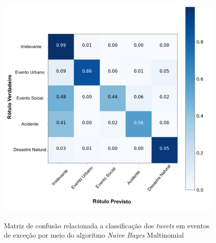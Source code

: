 \documentclass[
	12pt,				%
	oneside,			%
	a4paper,			%
	english,			%
	brazil				%
	]{abntex2ppgsi}
\begin{document}
{{{\begin{apendicesenv}
\begin{figure}[!htb]
	\centering
 	  \caption{Matriz de confusão relacionada a classificação dos \textit{tweets} em eventos de exceção por meio do algoritmo \textit{Naive Bayes} Multinomial}
		\includegraphics[width=1\linewidth]{images/confusion_matrix_mnb_pt.png}
	\label{fig:confusion_matrix_mnb}
\end{figure}


\end{apendicesenv}}}}
\end{document}

